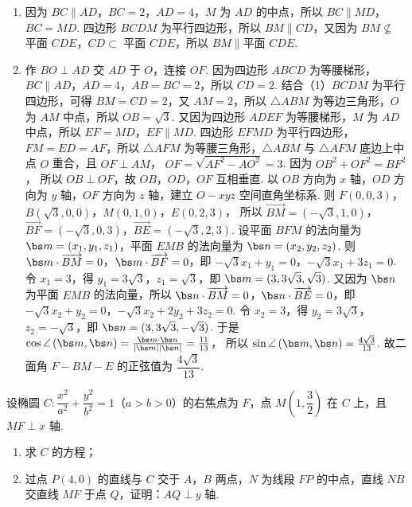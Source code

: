 \begin{solution}
\begin{enumerate}
\item 因为 \( BC\parallel AD \)，\( BC=2 \)，\( AD=4 \)，\(M\) 为 \(AD\) 的中点，所以 \( BC\parallel MD \)，\( BC=MD \).
四边形 \(BCDM\) 为平行四边形，所以 \( BM\parallel CD \)，又因为 \( BM\nsubseteq \) 平面 \(CDE\)，\( CD\subset \) 平面 \(CDE\)，所以 \( BM\parallel \)平面 \(CDE\).

\item 作 \( BO\perp AD \) 交 \(AD\) 于 \(O\)，连接 \(OF\).
因为四边形 \(ABCD\) 为等腰梯形，\( BC\parallel AD \)，\( AD=4 \)，\( AB=BC=2 \)，所以 \( CD=2 \).
结合（1）\(BCDM\) 为平行四边形，可得 \( BM=CD=2 \)，又 \( AM=2 \)，所以 \( \triangle ABM \) 为等边三角形，\(O\) 为 \(AM\) 中点，所以
\(OB=\sqrt{3}\).
又因为四边形 \(ADEF\) 为等腰梯形，\(M\) 为 \(AD\) 中点，所以 \( EF=MD \)，\( EF\parallel MD \).
四边形 \(EFMD\) 为平行四边形，\( FM=ED=AF \)，所以 \( \triangle AFM \) 为等腰三角形，\( \triangle ABM \) 与 \( \triangle AFM \) 底边上中点 \(O\) 重合，且 \( OF\perp AM \)，
\(OF=\sqrt{AF^2-AO^2}=3\).
因为
\(OB^2+OF^2=BF^2\)，
所以 \( OB\perp OF \)，故 \(OB\)，\(OD\)，\(OF\) 互相垂直.
以 \(OB\) 方向为 \( x \) 轴，\(OD\) 方向为 \( y \) 轴，\(OF\) 方向为 \( z \) 轴，建立 \( O-xyz \) 空间直角坐标系.
则
\(F(0,0,3)\)，\(B(\sqrt{3},0,0)\)，\(M(0,1,0)\)，\(E(0,2,3)\)，
所以
\(\overrightarrow{BM}=(-\sqrt{3},1,0)\)，\(\overrightarrow{BF}=(-\sqrt{3},0,3)\)，\(\overrightarrow{BE}=(-\sqrt{3},2,3)\).
设平面 \(BFM\) 的法向量为 \( \bs m=(x_1,y_1,z_1) \)，平面 \(EMB\) 的法向量为 \( \bs n=(x_2,y_2,z_2) \).
则 \( \bs m\cdot \overrightarrow{BM}=0 \)，\( \bs m\cdot \overrightarrow{BF}=0 \)，即 \( -\sqrt{3}x_1+y_1=0 \)，\( -\sqrt{3}x_1+3z_1=0 \). 令 \( x_1=3 \)，得 \( y_1=3\sqrt{3} \)，\( z_1=\sqrt{3} \)，即
\(\bs m=(3,3\sqrt{3},\sqrt{3})\).
又因为 \( \bs n \) 为平面 \(EMB\) 的法向量，所以 \( \bs n\cdot \overrightarrow{BM}=0 \)，\( \bs n\cdot \overrightarrow{BE}=0 \)，即 \( -\sqrt{3}x_2+y_2=0 \)，\( -\sqrt{3}x_2+2y_2+3z_2=0 \). 令 \( x_2=3 \)，得 \( y_2=3\sqrt{3} \)，\( z_2=-\sqrt{3} \)，即
\(\bs n=(3,3\sqrt{3},-\sqrt{3})\).
于是
\(\cos \angle \left( \bs m,\bs n \right)=\frac{\bs m\cdot \bs n}{|\bs m||\bs n|}=\frac{11}{13}\)，
所以
\(\sin \angle \left( \bs m,\bs n \right)=\frac{4\sqrt{3}}{13}\).
故二面角 \( F-BM-E \) 的正弦值为 \( \dfrac{4\sqrt{3}}{13} \).
\end{enumerate}
\end{solution}

\begin{problem}
设椭圆 \( C:\dfrac{x^2}{a^2}+\dfrac{y^2}{b^2}=1 \)（\( a>b>0 \)）的右焦点为 \(F\)，点 \( M\left( 1,\dfrac{3}{2} \right) \) 在 \(C\) 上，且 \( MF\perp x \) 轴.

\begin{enumerate}
\item 求 \(C\) 的方程；
\item 过点 \( P(4,0) \) 的直线与 \(C\) 交于 \(A\)，\(B\) 两点，\(N\) 为线段 \(FP\) 的中点，直线 \(NB\) 交直线 \(MF\) 于点 \(Q\)，证明：\( AQ\perp y \) 轴.
\end{enumerate}
\end{problem}

